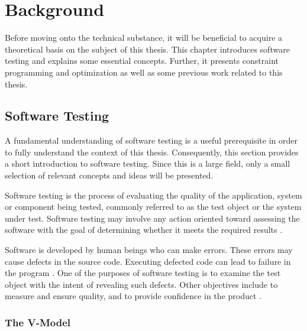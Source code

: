 \section{Background}\label{chapter.background}
\thispagestyle{plain}
Before moving onto the technical substance, it will be beneficial to acquire a theoretical basis on the subject of this thesis. This chapter introduces software testing and explains some essential concepts. Further, it presents constraint programming and optimization as well as some previous work related to this thesis.

\subsection{Software Testing}

A fundamental understanding of software testing is a useful prerequisite in order to fully understand the context of this thesis. Consequently, this section provides a short introduction to software testing. Since this is a large field, only a small selection of relevant concepts and ideas will be presented.  %

Software testing is the process of evaluating the quality of the application, system or component being tested, commonly referred to as the test object or the system under test. Software testing may involve any action oriented toward assessing the software with the goal of determining whether it meets the required results  \cite{[http://istqbexamcertification.com/what-is-a-software-testing/]}.

Software is developed by human beings who can make errors. These errors may cause defects in the source code. Executing defected code can lead to failure in the program  \cite{http://www.istqb.org/downloads/send/2-foundation-level-documents/3-foundation-level-syllabus-2011.html}. One of the purposes of software testing is to examine the test object with the intent of revealing such defects. Other objectives include to measure and ensure quality, and to provide confidence in the product \cite{SoftwareTestingFoundations}.

\subsubsection{The V-Model}\label{sec.v_model}


